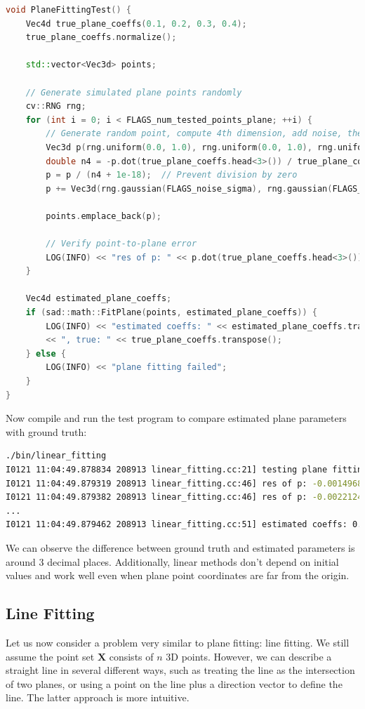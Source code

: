 \begin{lstlisting}[language=c++,caption=src/ch5/linear\_fitting.cc]
void PlaneFittingTest() {
	Vec4d true_plane_coeffs(0.1, 0.2, 0.3, 0.4);
	true_plane_coeffs.normalize();
	
	std::vector<Vec3d> points;
	
	// Generate simulated plane points randomly
	cv::RNG rng;
	for (int i = 0; i < FLAGS_num_tested_points_plane; ++i) {
		// Generate random point, compute 4th dimension, add noise, then normalize
		Vec3d p(rng.uniform(0.0, 1.0), rng.uniform(0.0, 1.0), rng.uniform(0.0, 1.0));
		double n4 = -p.dot(true_plane_coeffs.head<3>()) / true_plane_coeffs[3];
		p = p / (n4 + 1e-18);  // Prevent division by zero
		p += Vec3d(rng.gaussian(FLAGS_noise_sigma), rng.gaussian(FLAGS_noise_sigma), rng.gaussian(FLAGS_noise_sigma));
		
		points.emplace_back(p);
		
		// Verify point-to-plane error
		LOG(INFO) << "res of p: " << p.dot(true_plane_coeffs.head<3>()) + true_plane_coeffs[3];
	}
	
	Vec4d estimated_plane_coeffs;
	if (sad::math::FitPlane(points, estimated_plane_coeffs)) {
		LOG(INFO) << "estimated coeffs: " << estimated_plane_coeffs.transpose()
		<< ", true: " << true_plane_coeffs.transpose();
	} else {
		LOG(INFO) << "plane fitting failed";
	}
}
\end{lstlisting}

Now compile and run the test program to compare estimated plane parameters with ground truth:
\begin{lstlisting}[language=sh,caption=Terminal output:]
./bin/linear_fitting 
I0121 11:04:49.878834 208913 linear_fitting.cc:21] testing plane fitting
I0121 11:04:49.879319 208913 linear_fitting.cc:46] res of p: -0.00149684
I0121 11:04:49.879382 208913 linear_fitting.cc:46] res of p: -0.00221244
...
I0121 11:04:49.879462 208913 linear_fitting.cc:51] estimated coeffs: 0.186755 0.363656 0.546692 0.730757, true: 0.182574 0.365148 0.547723 0.730297
\end{lstlisting}

We can observe the difference between ground truth and estimated parameters is around 3 decimal places. Additionally, linear methods don't depend on initial values and work well even when plane point coordinates are far from the origin.

\subsection{Line Fitting}
\label{sec:line-fitting}
Let us now consider a problem very similar to plane fitting: line fitting. We still assume the point set $\bm{X}$ consists of $n$ 3D points. However, we can describe a straight line in several different ways, such as treating the line as the intersection of two planes, or using a point on the line plus a direction vector to define the line. The latter approach is more intuitive.

